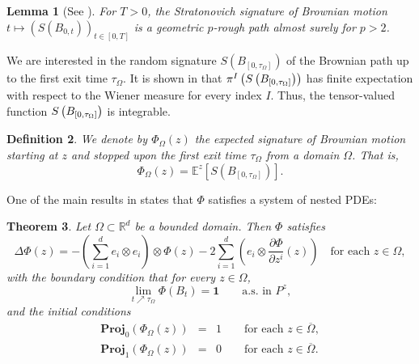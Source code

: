 \documentclass[11pt,a4paper,english,reqno]{amsart}
\theoremstyle{plain}
\newtheorem{definition}{Definition}[section]
\newtheorem{theorem}[definition]{Theorem}
\newtheorem{lemma}[definition]{Lemma}
\newcommand{\R}{\mathbb{R}}
\newcommand{\1}{\mathbbm{1}}
\newcommand{\proj}{\mathbf{Proj}}
\begin{document}
\begin{lemma}[See {\cite{friz2005approximations}}]\label{Lemma_BM_GRP}
For $T >0$, the Stratonovich signature of Brownian motion $t \mapsto (S(B_{0, t}))_{t \in [0, T]}$ is a geometric $p$-rough path almost surely for $p>2$. 
\end{lemma}


We are interested in the random signature $S\left(B_{[0, \tau_{\Omega }]}\right)$ of the Brownian path up to the first exit time $\tau_\Omega$. It is shown  in \cite{lyons2015expected} that $\pi^{I}\left(S\left( B_{%
\left[ 0,\tau _{\Omega }\right] }\right)\right)$ has finite expectation with respect to the Wiener measure for every index $I$. Thus, the tensor-valued function $S\left( B_{%
\left[ 0,\tau _{\Omega }\right] }\right)$ is integrable.
\begin{definition}%
 We denote by $\Phi _{\Omega }(z)$ the expected signature of Brownian motion starting at $z$ and stopped upon the first exit time $\tau _{\Omega }$ from a domain $\Omega $. That is,
\begin{equation*}
\Phi _{\Omega }(z)=\mathbb{E}^{z}\left[S\left(B_{ \left[ 0,\tau_{\Omega  }\right] }\right)\right].
\end{equation*}
\end{definition}


One of the main results in \cite{lyons2015expected} states that $\Phi$ satisfies a system of nested PDEs:
\begin{theorem}
\label{PDE_theorem}\label{PDE_theorem_Phi}
Let $\Omega \subset \R^d$ be a bounded domain. Then $\Phi$ satisfies
\begin{equation}\label{ES_BM_PDE}
\Delta \Phi(z)=-\left(\sum_{i=1}^{d}e_{i}\otimes e_{i}\right)\otimes
\Phi (z)-2\sum_{i=1}^{d}\left( e_{i}\otimes \frac{\partial \Phi
}{\partial z^{i}}(z)\right) \quad\text{for each  }z\in \Omega ,
\end{equation}%
with the boundary condition that for every $z \in \Omega $,
\begin{equation}\label{bc, original}
\lim_{t \nearrow \tau_{\Omega }}\Phi(B_{t})=\mathbf{1}\qquad \text{a.s. in } P^{z}  ,
\end{equation}%
and the initial conditions
\begin{eqnarray}
\proj_{0}(\Phi_{\Omega}(z)) &=&1 \qquad\text{for each }z\in\overline{\Omega }, \label{ic 1} \\
\proj_{1}(\Phi_{\Omega}(z)) &=&0 \qquad\text{for each }z\in \overline{\Omega}\label{ic 2}.
\end{eqnarray}
\end{theorem}
\end{document}
